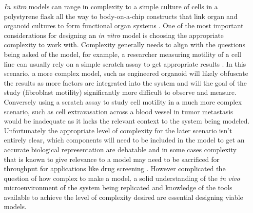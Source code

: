 \textit{In vitro} models can range in complexity to a simple culture of cells in a polystyrene flask all the way to body-on-a-chip constructs that link organ and organoid cultures to form functional organ systems \cite{Esch2011a}. One of the most important considerations for designing an \textit{in vitro} model is choosing the appropriate complexity to work with. Complexity generally needs to align with the questions being asked of the model, for example, a researcher measuring motility of a cell line can usually rely on a simple scratch assay to get appropriate results \cite{liang2007vitro}. In this scenario, a more complex model, such as engineered organoid will likely obfuscate the results as more factors are integrated into the system and will the goal of the study (fibroblast motility) significantly more difficult to observe and measure. Conversely using a scratch assay to study cell motility in a much more complex scenario, such as cell extravasation across a blood vessel in tumor metastasis would be inadequate as it lacks the relevant context to the system being modeled. Unfortunately the appropriate level of complexity for the later scenario isn't entirely clear, which components will need to be included in the model to get an accurate biological representation are debatable \cite{Bouet2015, davies2015capturing, stock2016capturing, Munch2000} and in some cases complexity that is known to give relevance to a model may need to be sacrificed for throughput for applications like drug screening \cite{Hickman2014Three-dimensionalVivo.}. However complicated the question of how complex to make a model, a solid understanding of the \textit{in vivo} microenvironment of the system being replicated and knowledge of the tools available to achieve the level of complexity desired are essential designing viable models. 

